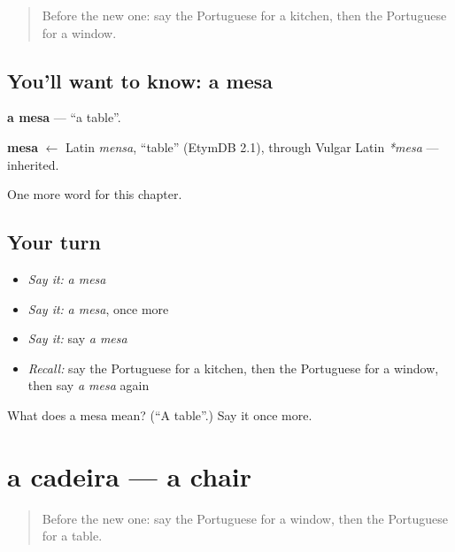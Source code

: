 \label{lesson:PT-C48-mesa}



\begin{quote}
Before the new one: say the Portuguese for a kitchen, then the Portuguese for a window.
\end{quote}

\subsection*{You'll want to know: a mesa}
\textbf{a mesa} — \textquotedblleft{}a table\textquotedblright{}.

\begin{cousinweb}
\textbf{mesa} $\leftarrow$ Latin \emph{mensa}, \textquotedblleft{}table\textquotedblright{} (EtymDB 2.1), through Vulgar Latin \emph{*mesa} — inherited.
\end{cousinweb}

\begin{grammarlens}[title={What you've built}]
One more word for this chapter.
\end{grammarlens}

\subsection*{Your turn}
\begin{itemize}
\raggedright
  \item \emph{Say it:} \emph{a mesa}
  \item \emph{Say it:} \emph{a mesa}, once more
  \item \emph{Say it:} say \emph{a mesa}
  \item \emph{Recall:} say the Portuguese for a kitchen, then the Portuguese for a window, then say \emph{a mesa} again
\end{itemize}

\begin{tcolorbox}[breakable,colback=teal!4,colframe=teal!35!black,title={Before you move on}]
What does a mesa mean? (\textquotedblleft{}A table\textquotedblright{}.) Say it once more.
\end{tcolorbox}
\section[a cadeira]{a cadeira — a chair}

\label{lesson:PT-C48-cadeira}



\begin{quote}
Before the new one: say the Portuguese for a window, then the Portuguese for a table.
\end{quote}

